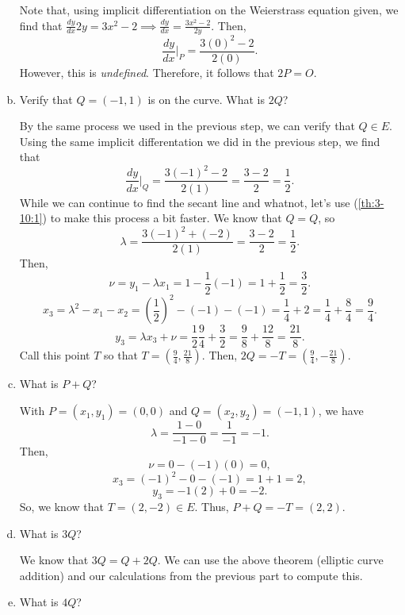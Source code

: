\documentclass[letterpaper]{article}
\begin{document}
\begin{mdframed}
\begin{enumerate}[(a)]
\begin{mdframed}
            Note that, using implicit differentiation on the Weierstrass equation given, we find that $\frac{dy}{dx} 2y = 3x^2 - 2 \implies \frac{dy}{dx} = \frac{3x^2 - 2}{2y}$. Then, \[\frac{dy}{dx}\bigg\rvert_{P} = \frac{3(0)^2 - 2}{2(0)}.\] However, this is \emph{undefined}. Therefore, it follows that $2P = O$. 
        \end{mdframed}
        \item Verify that $Q = (-1, 1)$ is on the curve. What is $2Q$?
        \begin{mdframed}
            By the same process we used in the previous step, we can verify that $Q \in E$. Using the same implicit differentation we did in the previous step, we find that 
            \[\frac{dy}{dx}\bigg\rvert_{Q} = \frac{3(-1)^2 - 2}{2(1)} = \frac{3 - 2}{2} = \frac{1}{2}.\] While we can continue to find the secant line and whatnot, let's use (\ref{th:3-10:1}) to make this process a bit faster. We know that $Q = Q$, so
            \[\lambda = \frac{3(-1)^2 + (-2)}{2(1)} = \frac{3 - 2}{2} = \frac{1}{2}.\] Then, \[\nu = y_1 - \lambda x_1 = 1 - \frac{1}{2}(-1) = 1 + \frac{1}{2} = \frac{3}{2}.\]
            \[x_3 = \lambda^2 - x_1 - x_2 = \left(\frac{1}{2}\right)^2 - (-1) - (-1) = \frac{1}{4} + 2 = \frac{1}{4} + \frac{8}{4} = \frac{9}{4}.\]
            \[y_3 = \lambda x_3 + \nu = \frac{1}{2}\frac{9}{4} + \frac{3}{2} = \frac{9}{8} + \frac{12}{8} = \frac{21}{8}.\]
            Call this point $T$ so that $T = \left(\frac{9}{4}, \frac{21}{8}\right)$. Then, $2Q = -T = \left(\frac{9}{4}, -\frac{21}{8}\right)$.
        \end{mdframed}
        \item What is $P + Q$? 
        \begin{mdframed}
            With $P = (x_1, y_1) = (0, 0)$ and $Q = (x_2, y_2) = (-1, 1)$, we have 
            \[\lambda = \frac{1 - 0}{-1 - 0} = \frac{1}{-1} = -1.\]
            Then, 
            \[\nu = 0 - (-1)(0) = 0,\]
            \[x_3 = (-1)^2 - 0 - (-1) = 1 + 1 = 2,\]
            \[y_3 = -1(2) + 0 = -2.\]
            So, we know that $T = (2, -2) \in E$. Thus, $P + Q = -T = (2, 2)$.   
        \end{mdframed}
        \item What is $3Q$? 
        \begin{mdframed}
            We know that $3Q = Q + 2Q$. We can use the above theorem (elliptic curve addition) and our calculations from the previous part to compute this.
        \end{mdframed}
        \item What is $4Q$? 

\end{enumerate}
\end{mdframed}
\end{document}
